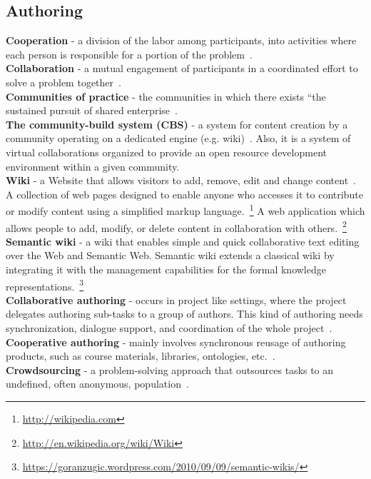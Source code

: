 \documentclass[PhD, Submit, ngerman,UKenglish,table]{scrbook}
\begin{document}
\subsection{Authoring}
\textbf{Cooperation} - a division of the labor among participants, into activities where each person is responsible for a portion of the problem~\cite{roschelle1995construction}.\\
\textbf{Collaboration} - a mutual engagement of participants in a coordinated effort to solve a problem together~\cite{Romero-Moreno2007}.\\ 
\textbf{Communities of practice} - the communities in which there exists “the sustained pursuit of shared enterprise~\cite{wenger1998communities}.\\
\textbf{The community-build system (CBS)} - a system for content creation by a community operating on a dedicated engine (e.g. wiki)~\cite{Ro.zewski2011}.
Also, it is a system of virtual collaborations organized to provide an open resource development environment within a given community. \\
\textbf{Wiki} - a Website that allows visitors to add, remove, edit and change content~\cite{Dahlan2010}.
A collection of web pages designed to enable anyone who accesses it to contribute or modify content using a simplified markup language.~\footnote{\url{http://wikipedia.com}}
A web application which allows people to add, modify, or delete content in collaboration with others.~\footnote{\url{http://en.wikipedia.org/wiki/Wiki}}\\ 
\textbf{Semantic wiki} - a wiki that enables simple and quick collaborative text editing over the Web and Semantic Web. Semantic wiki extends a classical wiki by integrating it with the management capabilities for the formal knowledge representations.~\footnote{\url{https://goranzugic.wordpress.com/2010/09/09/semantic-wikis/}}\\
\textbf{Collaborative authoring} - occurs in project like settings, where the project delegates authoring sub-tasks to a group of authors.
This kind of authoring needs synchronization, dialogue support, and coordination of the whole project~\cite{dicheva2002collaborative}.\\
\textbf{Cooperative authoring} - mainly involves synchronous reusage of authoring products, such as course materials, libraries, ontologies, etc.~\cite{dicheva2002collaborative}.\\ 
\textbf{Crowdsourcing} - a problem-solving approach that outsources tasks to an undefined, often anonymous, population~\cite{howe2006rise}. \\
\end{document}
